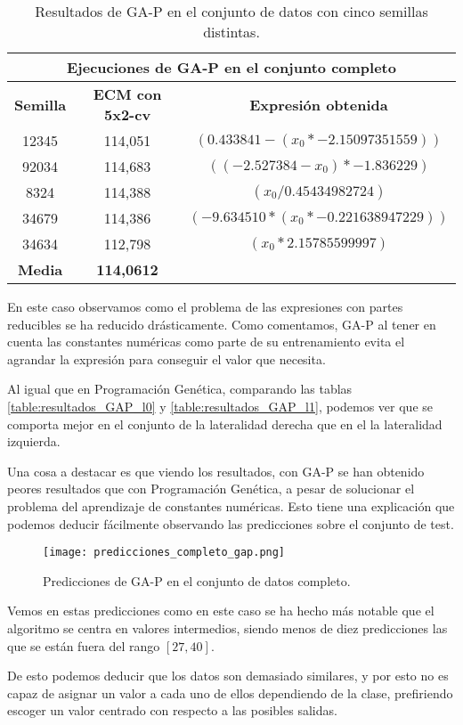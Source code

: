 \begin{table}[H]
\centering
\begin{tabular}{|c|c|c|}
\hline
\multicolumn{3}{|c|}{\textbf{Ejecuciones de GA-P en el conjunto completo}}             \\ \hline
\textbf{Semilla} & \textbf{ECM con 5x2-cv} & \textbf{Expresión obtenida}               \\ \hline
12345            & 114,051                 & $( 0.433841 - ( x_0  * -2.15097351559 ) )$   \\ \hline
92034            & 114,683                 & $( ( -2.527384  -  x_0 ) * -1.836229 )$      \\ \hline
8324             & 114,388                 & $( x_0  / 0.45434982724 )$                   \\ \hline
34679            & 114,386                 & $( -9.634510  * ( x_0 * -0.221638947229 ) )$ \\ \hline
34634            & 112,798                 & $( x_0  * 2.15785599997 )$                   \\ \hline
\textbf{Media}   & \textbf{114,0612}       &                                           \\ \hline
\end{tabular}%
\caption{Resultados de GA-P en el conjunto de datos con cinco semillas distintas.}\label{table:resultados_GAP_c}

\end{table}


En este caso observamos como el problema de las expresiones con partes reducibles se ha reducido drásticamente. Como comentamos, GA-P al tener en cuenta las constantes numéricas como parte de su entrenamiento evita el agrandar la expresión para conseguir el valor que necesita.

Al igual que en Programación Genética, comparando las tablas \ref{table:resultados_GAP_l0} y \ref{table:resultados_GAP_l1}, podemos ver que se comporta mejor en el conjunto de la lateralidad derecha que en el la lateralidad izquierda.

Una cosa a destacar es que viendo los resultados, con GA-P se han obtenido peores resultados que con Programación Genética, a pesar de solucionar el problema del aprendizaje de constantes numéricas. Esto tiene una explicación que podemos deducir fácilmente observando las predicciones sobre el conjunto de test.

\begin{figure}[H]
	 \centering
	 \texttt{[image: predicciones\_completo\_gap.png]}
	 \caption{Predicciones de GA-P en el conjunto de datos completo.}
	\label{fig:predicciones_completo_gap}
\end{figure}

Vemos en estas predicciones como en este caso se ha hecho más notable que el algoritmo se centra en valores intermedios, siendo menos de diez predicciones las que se están fuera del rango $[27, 40]$.

De esto podemos deducir que los datos son demasiado similares, y por esto no es capaz de asignar un valor a cada uno de ellos dependiendo de la clase, prefiriendo escoger un valor centrado con respecto a las posibles salidas.


\newpage
